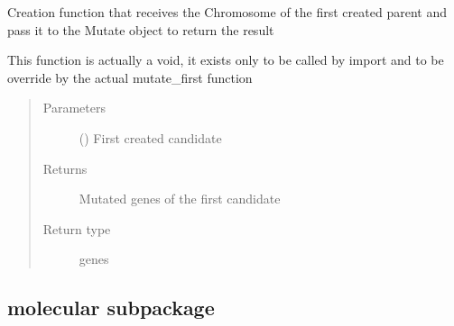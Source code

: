 \documentclass[letterpaper,10pt,english]{sphinxmanual}
\begin{document}
\begin{fulllineitems}
\label{\detokenize{MolOpt.genetic:MolOpt.genetic.genetic.mutate_first}}
\sphinxAtStartPar
Creation function that receives the Chromosome of the first created parent and pass it to the Mutate object to 
return the result

\sphinxAtStartPar
This function is actually a void, it exists only to be called by import and to be override by the actual 
mutate\_first function
\begin{quote}\begin{description}
\item[{Parameters}] \leavevmode
\sphinxAtStartPar
{} ({\hyperref[\detokenize{MolOpt.genetic:MolOpt.genetic.genetic.Chromosome}]{}}) \textendash{} First created candidate

\item[{Returns}] \leavevmode
\sphinxAtStartPar
Mutated genes of the first candidate

\item[{Return type}] \leavevmode
\sphinxAtStartPar
genes

\end{description}\end{quote}

\end{fulllineitems}



\subsection{molecular subpackage}
\label{\detokenize{MolOpt.molecular:module-MolOpt.molecular.molecular}}\label{\detokenize{MolOpt.molecular:molecular-subpackage}}\label{\detokenize{MolOpt.molecular::doc}}
\end{document}
